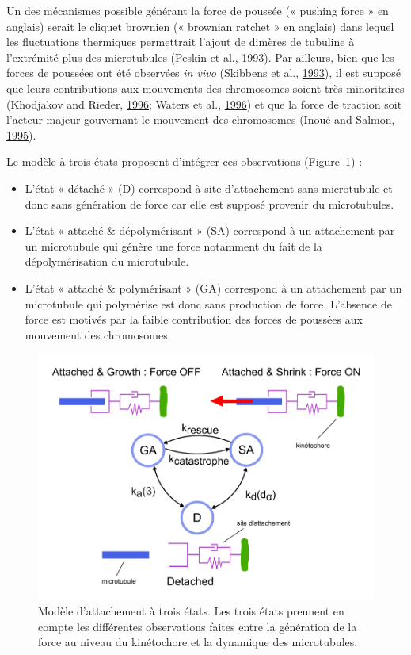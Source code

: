 \documentclass[12pt,a4paper,twoside,openright]{book}
\begin{document}
Un des mécanismes possible générant la force de poussée (« pushing force
» en anglais) serait le cliquet brownien (« brownian ratchet » en
anglais) dans lequel les fluctuations thermiques permettrait l'ajout de
dimères de tubuline à l'extrémité plus des microtubules (Peskin et al.,
\hyperref[ref-Peskin1993]{1993}). Par ailleurs, bien que les forces de
poussées ont été observées \emph{in vivo} (Skibbens et al.,
\hyperref[ref-Skibbens1993]{1993}), il est supposé que leurs
contributions aux mouvements des chromosomes soient très minoritaires
(Khodjakov and Rieder, \hyperref[ref-Khodjakov1996]{1996}; Waters et
al., \hyperref[ref-Waters1996a]{1996}) et que la force de traction soit
l'acteur majeur gouvernant le mouvement des chromosomes (Inoué and
Salmon, \hyperref[ref-Inoue1995]{1995}).

Le modèle à trois états proposent d'intégrer ces observations
(Figure~\ref{fig:three_states}) :

\begin{itemize}
\item
  L'état « détaché » (D) correspond à site d'attachement sans
  microtubule et donc sans génération de force car elle est supposé
  provenir du microtubules.
\item
  L'état « attaché \& dépolymérisant » (SA) correspond à un attachement
  par un microtubule qui génère une force notamment du fait de la
  dépolymérisation du microtubule.
\item
  L'état « attaché \& polymérisant » (GA) correspond à un attachement
  par un microtubule qui polymérise est donc sans production de force.
  L'absence de force est motivés par la faible contribution des forces
  de poussées aux mouvement des chromosomes.
\end{itemize}

\begin{figure}[htbp]
\centering
\includegraphics{figures/results/modelling/three_states.png}
\caption[Modèle d'attachement à trois états]{\label{fig:three_states}Modèle
d'attachement à trois états. Les trois états prennent en compte les
différentes observations faites entre la génération de la force au
niveau du kinétochore et la dynamique des microtubules.}
\end{figure}
\end{document}
